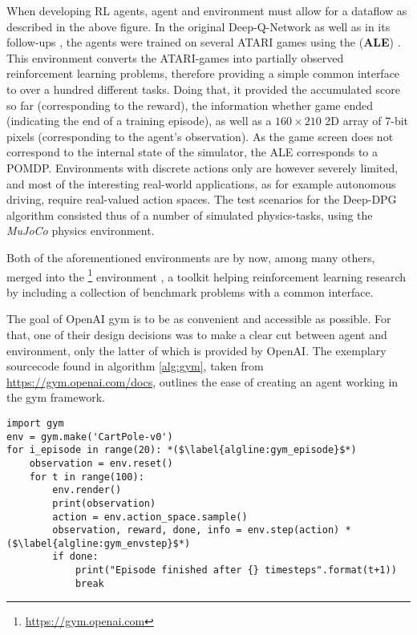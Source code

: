 When developing RL agents, agent and environment must allow for a dataflow as described in the above figure. In the original Deep-Q-Network \cite{mnih_playing_2013} as well as in its follow-ups \cite{van_hasselt_deep_2015, wang_dueling_2015}, the agents were trained on several ATARI games using the  (\textbf{ALE}) \cite{bellemare_arcade_2012}. This environment converts the ATARI-games into partially observed reinforcement learning problems, therefore providing a simple common interface to over a hundred different tasks. Doing that, it provided the accumulated score so far (corresponding to the reward), the information whether game ended (indicating the end of a training episode), as well as a $160 \times 210$  2D array of 7-bit pixels (corresponding to the agent's observation). As the game screen does not correspond to the internal state of the simulator, the ALE corresponds to a POMDP. Environments with discrete actions only are however severely limited, and most of the interesting real-world applications, as for example autonomous driving, require real-valued action spaces. The test scenarios for the Deep-DPG algorithm consisted thus of a number of simulated physics-tasks, using the \textit{MuJoCo} physics environment. 

Both of the aforementioned environments are by now, among many others, merged into the \footnote{\url{https://gym.openai.com}} environment \cite{brockman_openai_2016}, a toolkit helping reinforcement learning research by including a collection of benchmark problems with a common interface.

The goal of OpenAI gym is to be as convenient and accessible as possible. For that, one of their design decisions was to make a clear cut between agent and environment, only the latter of which is provided by OpenAI. The exemplary sourcecode found in algorithm \ref{alg:gym}, taken from \url{https://gym.openai.com/docs}, outlines the ease of creating an agent working in the gym framework.
\begin{algorithm}[h]
\begin{lstlisting}[style=Python]
import gym
env = gym.make('CartPole-v0')
for i_episode in range(20): *($\label{algline:gym_episode}$*)
	observation = env.reset()
	for t in range(100):
		env.render()
		print(observation)
		action = env.action_space.sample()
		observation, reward, done, info = env.step(action) *($\label{algline:gym_envstep}$*)
		if done:
			print("Episode finished after {} timesteps".format(t+1))
			break
\end{lstlisting}%
\caption{Interaction with the OpenAI gym environment}
\label{alg:gym}
\end{algorithm}


